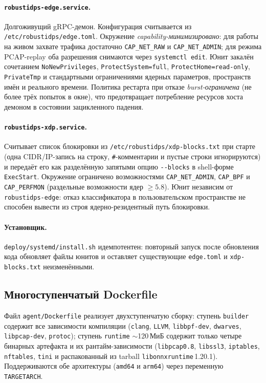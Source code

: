 \paragraph{\texttt{robustidps-edge.service}.}
Долгоживущий gRPC-демон. Конфигурация считывается из
\texttt{/etc/\allowbreak robustidps/\allowbreak edge.toml}. Окружение
\emph{capability-минимизировано}: для работы на живом захвате трафика
достаточно \texttt{CAP\_NET\_RAW} и \texttt{CAP\_NET\_ADMIN}; для
режима PCAP-replay оба разрешения снимаются через \texttt{systemctl
edit}. Юнит закалён сочетанием \texttt{NoNewPrivileges},
\texttt{ProtectSystem=full}, \texttt{ProtectHome=read-only},
\texttt{PrivateTmp} и стандартными ограничениями ядерных параметров,
пространств имён и реального времени. Политика рестарта при отказе
\emph{burst-ограничена} (не более трёх попыток в окне), что
предотвращает потребление ресурсов хоста демоном в состоянии
зацикленного падения.

\paragraph{\texttt{robustidps-xdp.service}.}
Считывает список блокировки из
\texttt{/etc/\allowbreak robustidps/\allowbreak xdp-blocks.txt} при старте (одна
CIDR/IP-запись на строку, \texttt{\#}-комментарии и пустые строки
игнорируются) и передаёт его как разделённую запятыми опцию
\texttt{-{}-blocks} в shell-форме \texttt{ExecStart}. Окружение
ограничено возможностями \texttt{CAP\_NET\_ADMIN}, \texttt{CAP\_BPF}
и \texttt{CAP\_PERFMON} (раздельные возможности ядер $\geq 5.8$).
Юнит независим от \texttt{robustidps-edge}: отказ классификатора в
пользовательском пространстве не способен вывести из строя
ядерно-резидентный путь блокировки.

\paragraph{Установщик.}
\texttt{deploy/\allowbreak systemd/\allowbreak install.sh} идемпотентен: повторный запуск
после обновления кода обновляет файлы юнитов и оставляет
существующие \texttt{edge.toml} и \texttt{xdp-blocks.txt}
неизменёнными.

\subsection{Многоступенчатый Dockerfile}

Файл \texttt{agent/Dockerfile} реализует двухступенчатую сборку:
ступень \texttt{builder} содержит все зависимости компиляции
(\texttt{clang}, \texttt{LLVM}, \texttt{libbpf-dev}, \texttt{dwarves},
\texttt{libpcap-dev}, \texttt{protoc}); ступень \texttt{runtime}
$\sim$120\,МиБ содержит только четыре бинарных артефакта и их
рантайм-зависимости (\texttt{libpcap0.8}, \texttt{libssl3},
\texttt{iptables}, \texttt{nftables}, \texttt{tini} и распакованный
из tarball \texttt{libonnxruntime}\,1.20.1). Поддерживаются обе
архитектуры (\texttt{amd64} и \texttt{arm64}) через переменную
\texttt{TARGETARCH}.

